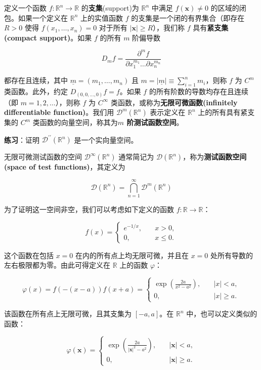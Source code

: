 定义一个函数 $f: \mathbb{R}^n \rightarrow \mathbb{R}$
的\textbf{支集}(support)为 $\mathbb{R}^n$ 中满足
$f(\mathbf{x}) \neq 0$ 的区域的闭包。如果一个定义在 $\mathbb{R}^n$
上的实值函数 $f$ 的支集是一个闭的有界集合（即存在 $R>0$ 使得
$f(x_1, \ldots, x_n)=0$ 对于所有 $|\mathbf{x}| \geq R$），我们称
$f$ 具有\textbf{紧支集(compact support)}。如果 $f$ 的所有 $m$
阶偏导数

$$
D_m f = \frac{\partial^m f}{\partial x_1^{m_1} \ldots \partial x_n^{m_n}}
$$

都存在且连续，其中 $\underline{m} = (m_1, \ldots, m_n)$ 且
$m = |\underline{m}| \equiv \sum_{i=1}^n m_i$，则称 $f$ 为 $C^m$
类函数。此外，约定 $D_{(0,0,\ldots,0)} f = f$。如果 $f$
的所有阶数的导数均存在且连续（即 $m = 1, 2, \ldots$），则称 $f$ 为
$C^{\infty}$ 类函数，或称为\textbf{无限可微函数(infinitely
differentiable function)}。我们用 $\mathcal{D}^m(\mathbb{R}^n)$
表示定义在 $\mathbb{R}^n$ 上的所有具有紧支集的 $C^m$
类函数的向量空间，称其为\textbf{$m$ 阶测试函数空间}。

\textbf{练习}：证明 $\mathcal{D}^{\prime \prime}(\mathbb{R}^n)$
是一个实向量空间。

无限可微测试函数的空间 $\mathcal{D}^\infty(\mathbb{R}^n)$ 通常简记为
$\mathcal{D}(\mathbb{R}^n)$，称为\textbf{测试函数空间(space of test functions)}，其定义为

$$
\mathcal{D}(\mathbb{R}^n) = \bigcap_{n=1}^\infty \mathcal{D}^m(\mathbb{R}^n)
$$

为了证明这一空间非空，我们可以考虑如下定义的函数
$f: \mathbb{R} \rightarrow \mathbb{R}$：

$$
f(x) =
\begin{cases}
e^{-1 / x}, & \quad x > 0, \\
0, & \quad x \leq 0.
\end{cases}
$$

这个函数在包括 $x=0$ 在内的所有点上均无限可微，并且在 $x=0$
处所有导数的左右极限都为零。由此可得定义在 $\mathbb{R}$ 上的函数
$\varphi$：

$$
\varphi(x) = f(-(x-a)) f(x+a) =
\begin{cases}
\exp\left(\frac{2a}{x^2 - a^2}\right), & \quad |x| < a, \\
0, & \quad |x| \geq a.
\end{cases}
$$

该函数在所有点上无限可微，且其支集为 $[-a, a]$。在 $\mathbb{R}^n$
中，也可以定义类似的函数：

$$
\varphi(\mathbf{x}) =
\begin{cases}
\exp\left(\frac{2a}{|\mathbf{x}|^2 - a^2}\right), & \quad |\mathbf{x}| < a, \\
0, & \quad |\mathbf{x}| \geq a.
\end{cases}
$$

